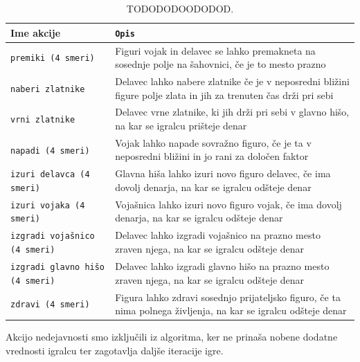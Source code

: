\documentclass[a4paper, 12pt]{book}
\begin{document}
\begin{table}
	\begin{center}
		\begin{tabular}{p{0.3\linewidth}|p{0.7\linewidth}}
			Ime akcije                          & {\tt Opis} \\ \hline
			{\tt premiki (4 smeri)}             & Figuri vojak in delavec se lahko premakneta na sosednje polje na šahovnici, če je to mesto prazno \\
			{\tt naberi zlatnike}               & Delavec lahko nabere zlatnike če je v neposredni bližini figure polje zlata in jih za trenuten čas drži pri sebi\\
			{\tt vrni zlatnike}                 & Delavec vrne zlatnike, ki jih drži pri sebi v glavno hišo, na kar se igralcu prišteje denar \\
			{\tt napadi (4 smeri)}              & Vojak lahko napade sovražno figuro, če je ta v neposredni bližini in jo rani za določen faktor \\
			{\tt izuri delavca (4 smeri)}       & Glavna hiša lahko izuri novo figuro delavec, če ima dovolj denarja, na kar se igralcu odšteje denar\\
			{\tt izuri vojaka (4 smeri)}        &  Vojašnica lahko izuri novo figuro vojak, če ima dovolj denarja, na kar se igralcu odšteje denar \\
			{\tt izgradi vojašnico (4 smeri)}   & Delavec lahko izgradi vojašnico na prazno mesto zraven njega, na kar se igralcu odšteje denar \\
			{\tt izgradi glavno hišo (4 smeri)} &  Delavec lahko izgradi glavno hišo na prazno mesto zraven njega, na kar se igralcu odšteje denar \\
			{\tt zdravi (4 smeri)}              & Figura lahko zdravi sosednjo prijateljsko figuro, če ta nima polnega življenja, na kar se igralcu odšteje denar\\
		\end{tabular}
	\end{center}
	\caption{TODODODOODODOD.}
	\label{tableActions}
\end{table}


Akcijo nedejavnosti smo izključili iz algoritma, ker ne prinaša nobene dodatne vrednosti igralcu ter zagotavlja daljše iteracije igre.
\end{document}
